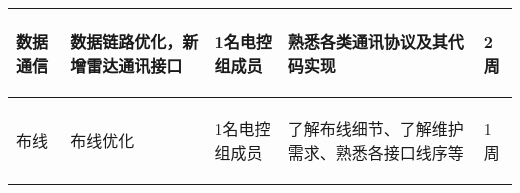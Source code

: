 \begin{longtable}{ p{2cm} | p{3cm} | p{3cm} | p{4.8cm} | p{2cm} |}
    \hline
    

        \begin{center}
            数据通信
        \end{center} &
        \begin{center}
            数据链路优化，新增雷达通讯接口
        \end{center} &
        \begin{center}
            1名电控组成员
        \end{center} &
        \begin{center}
            熟悉各类通讯协议及其代码实现
        \end{center} &
        \begin{center}
            2周
        \end{center} \\

    \hline

        \begin{center}
            布线
        \end{center} &
        \begin{center}
            布线优化
        \end{center} &
        \begin{center}
            1名电控组成员
        \end{center} &
        \begin{center}
            了解布线细节、了解维护需求、熟悉各接口线序等
        \end{center} &
        \begin{center}
            1周
        \end{center} \\
        
    \hline
    
\end{longtable}
